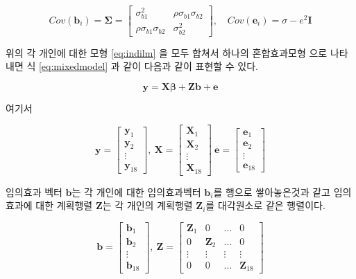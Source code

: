 \documentclass[
]{book}
\theoremstyle{definition}
\theoremstyle{definition}
\theoremstyle{definition}
\theoremstyle{remark}
\begin{document}
\[
Cov(\bm b_i) = \bm \Sigma =
\begin{bmatrix}
\sigma^2_{b1} & \rho \sigma_{b1} \sigma_{b2}\\
\rho \sigma_{b1} \sigma_{b2} & \sigma^2_{b2} 
\end{bmatrix}, \quad
Cov(\bm e_i) = \sigma-e^2
 \bm I
\]

위의 각 개인에 대한 모형 \eqref{eq:indilm} 을 모두 합쳐서 하나의 혼합효과모형 으로 나타내면 식 \eqref{eq:mixedmodel} 과 같이 다음과 같이 표현할 수 있다.

\begin{equation*}
\bm  y = \bm  X \bm \beta + \bm Z \bm b + \bm e 
\end{equation*}

여기서

\[ 
\bm y=\left[ \begin{array}{c}
\bm y_{1} \\
\bm y_{2} \\
\vdots \\
\bm y_{18}
\end{array} \right],~\bm X =
\left[ \begin{array}{c}
\bm X_1 \\
\bm X_2 \\
\vdots   \\
\bm  X_{18} 
\end{array} \right]
~ \bm e =
\left[ \begin{array}{c}
\bm e_1 \\
\bm e_2 \\
\vdots  \\
\bm e_{18} 
\end{array} \right]
\]

임의효과 벡터 \(\bm b\)는 각 개인에 대한 임의효과벡터 \(\bm b_i\)를 행으로 쌓아놓은것과 같고 임의효과에 대한 계획행렬 \(\bm Z\)는 각 개인의 계획행렬 \(\bm Z_i\)를 대각원소로 같은 행렬이다.

\[
\bm b=\left[ \begin{array}{c}
\bm b_{1} \\
\bm b_{2} \\
\vdots \\
\bm b_{18}
\end{array} \right],~\bm Z =
\left[ \begin{array}{cccc}
\bm Z_1 & 0 & \dots & 0 \\
0   & \bm Z_2 & \dots & 0 \\
\vdots & \vdots & \vdots & \vdots  \\
0 & 0 & \dots & \bm Z_{18}
\end{array} \right]
\]
\end{document}
